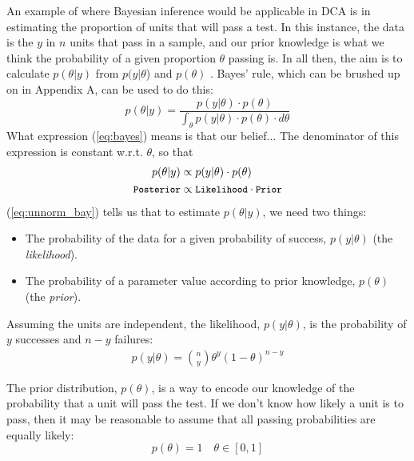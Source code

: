 \documentclass[11pt,a4paper,article]{memoir} %
\begin{document}
\par
An example of where Bayesian inference would be applicable in DCA is in estimating the proportion of units that will pass a test.
In this instance, the data is the $y$ in $n$ units that pass in a sample, and our prior knowledge is what we think the probability of a given proportion $\theta$ passing is. In all then, the aim is to calculate $p(\theta|y)$ from $p(y|\theta$) and $p(\theta)$ . Bayes' rule, which can be brushed up on in Appendix A, can be used to do this:
\begin{equation}
  p(\theta|y) = \frac{p(y|\theta)\cdot p(\theta)}{\int_{\theta}p(y|\theta)\cdot p(\theta)\cdot d\theta}
  \label{eq:bayes}
\end{equation}
What expression (\ref{eq:bayes}) means is that our belief... The denominator of this expression is constant w.r.t. $\theta$, so that
\begin{align}
  p(\theta|y) &\propto p(y | \theta)\cdot p(\theta)   \label{eq:unnorm_bay} \\
  \small{\texttt{Posterior}} &\propto\small{{\texttt{Likelihood} \cdot \texttt{Prior}}} \nonumber
\end{align}
(\ref{eq:unnorm_bay}) tells us that to estimate $p(\theta|y)$, we need two things:
\begin{itemize}
\item The probability of the data for a given probability of success, $p(y|\theta)$ (the \emph{likelihood}).
\item  The probability of a parameter value according to prior knowledge, $p(\theta)$ (the \emph{prior}).
\end{itemize}

Assuming the units are independent, the likelihood, $p(y|\theta)$, is the probability of $y$ successes and $n-y$ failures:
\begin{gather}
  p(y|\theta) = \binom{n}{y} \theta^y (1 - \theta)^{n - y}
\end{gather}

The prior distribution, $p(\theta)$, is a way to encode our knowledge of the probability that a unit will pass the test. If we don't know how likely a unit is to pass, then it may be reasonable to assume that all passing probabilities are equally likely:
\begin{equation}
  p(\theta) = 1 \quad \theta \in [0, 1]
\end{equation}
\end{document}

